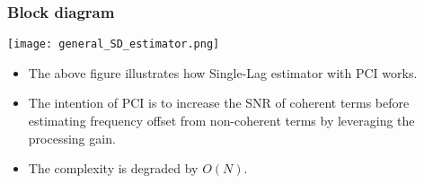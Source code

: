 \begin{frame}
  \frametitle{Block diagram}

    \begin{center}
      \texttt{[image: general\_SD\_estimator.png]}
    \end{center}

    \begin{itemize}
    
      \item The above figure illustrates how Single-Lag estimator with PCI works.
      \item The intention of PCI is to increase the SNR of coherent terms before estimating frequency offset from non-coherent terms by leveraging the processing gain.
      \item The complexity is degraded by $O(N)$.

    \end{itemize}



\end{frame}


